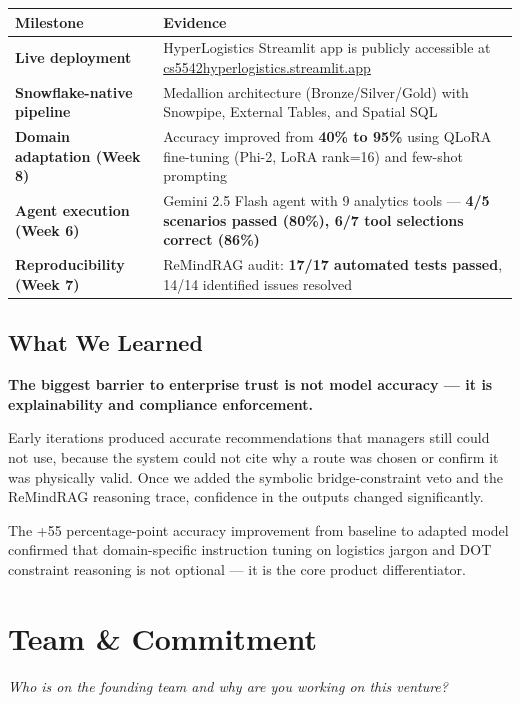 \documentclass[11pt,letterpaper]{article}
\begin{document}
\vspace{0.3em}
\begin{tabular}{@{}L{4.5cm}L{9cm}@{}}
    \toprule
    \textbf{Milestone} & \textbf{Evidence} \\
    \midrule
    \textbf{Live deployment} & HyperLogistics Streamlit app is publicly accessible at \href{https://cs5542hyperlogistics.streamlit.app/}{cs5542hyperlogistics.streamlit.app} \\[0.4em]
    \textbf{Snowflake-native pipeline} & Medallion architecture (Bronze/Silver/Gold) with Snowpipe, External Tables, and Spatial SQL \\[0.4em]
    \textbf{Domain adaptation (Week 8)} & Accuracy improved from \textbf{40\% to 95\%} using QLoRA fine-tuning (Phi-2, LoRA rank=16) and few-shot prompting \\[0.4em]
    \textbf{Agent execution (Week 6)} & Gemini 2.5 Flash agent with 9 analytics tools --- \textbf{4/5 scenarios passed (80\%), 6/7 tool selections correct (86\%)} \\[0.4em]
    \textbf{Reproducibility (Week 7)} & ReMindRAG audit: \textbf{17/17 automated tests passed}, 14/14 identified issues resolved \\
    \bottomrule
\end{tabular}
\vspace{0.5em}

\subsection*{What We Learned}

\textbf{The biggest barrier to enterprise trust is not model accuracy --- it is explainability and compliance enforcement.}

Early iterations produced accurate recommendations that managers still could not use, because the system could not cite why a route was chosen or confirm it was physically valid. Once we added the symbolic bridge-constraint veto and the ReMindRAG reasoning trace, confidence in the outputs changed significantly.

The +55 percentage-point accuracy improvement from baseline to adapted model confirmed that domain-specific instruction tuning on logistics jargon and DOT constraint reasoning is not optional --- it is the core product differentiator.

\section{Team \& Commitment}
\textit{Who is on the founding team and why are you working on this venture?}
\end{document}
